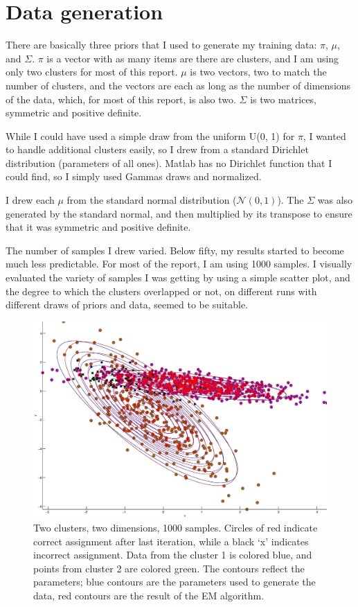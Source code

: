 \documentclass[11pt]{report}
\begin{document}
\section*{Data generation}

There are basically three priors that I used to generate my training data: $\pi$, $\mu$, and $\Sigma$. $\pi$ is a vector with as many items are there are clusters, and I am using only two clusters for most of this report. $\mu$ is two vectors, two to match the number of clusters, and the vectors are each as long as the number of dimensions of the data, which, for most of this report, is also two. $\Sigma$ is two matrices, symmetric and positive definite.

While I could have used a simple draw from the uniform U(0, 1) for $\pi$, I wanted to handle additional clusters easily, so I drew from a standard Dirichlet distribution (parameters of all ones). Matlab has no Dirichlet function that I could find, so I simply used Gammas draws and normalized.

I drew each $\mu$ from the standard normal distribution ($\mathcal{N}(0, 1)$). The $\Sigma$ was also generated by the standard normal, and then multiplied by its transpose to ensure that it was symmetric and positive definite.

The number of samples I drew varied. Below fifty, my results started to become much less predictable. For most of the report, I am using 1000 samples.
I visually evaluated the variety of samples I was getting by using a simple scatter plot, and the degree to which the clusters overlapped or not, on different runs with different draws of priors and data, seemed to be suitable.

\begin{figure}[h]
  \centering
  \includegraphics[width=\textwidth]{2x2plot1.eps}
  \caption{Two clusters, two dimensions, 1000 samples. Circles of red indicate correct assignment after last iteration, while a black `x' indicates incorrect assignment. Data from the cluster 1 is colored blue, and points from cluster 2 are colored green. The contours reflect the parameters; blue contours are the parameters used to generate the data, red contours are the result of the EM algorithm.}
  \label{2x2plot1}
\end{figure}
\end{document}
